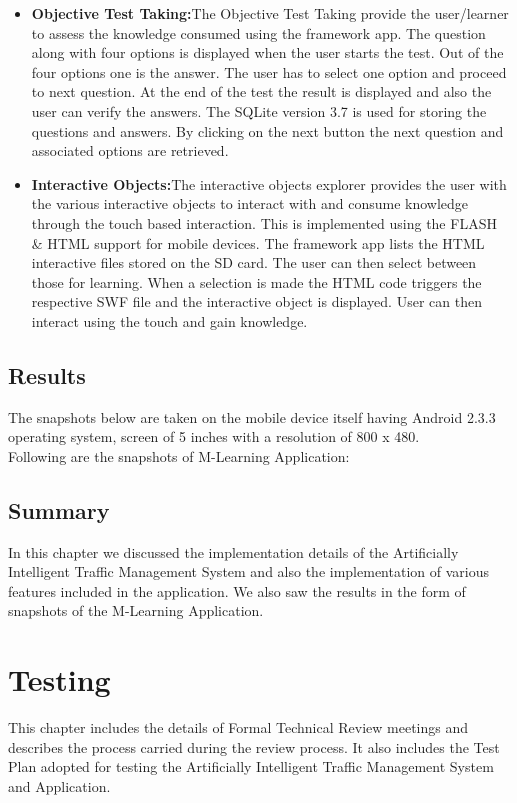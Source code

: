 \documentclass[openany,12pt]{report}
\begin{document}
\begin{itemize}
\item{\textbf{Objective Test Taking:}}The Objective Test Taking provide the user/learner to assess the knowledge consumed using the framework app. The question along with four options is displayed when the user starts the test. Out of the four options one is the answer. The user has to select one option and proceed to next question. At the end of the test the result is displayed and also the user can verify the answers. The SQLite version 3.7 is used for storing the questions and answers. By clicking on the next button the next question and associated options are retrieved.


\item{\textbf{Interactive Objects:}}The interactive objects explorer provides the user with the various interactive objects to interact with and consume knowledge through the touch based interaction. This is implemented using the FLASH \& HTML support for mobile devices. The framework app lists the HTML interactive files stored on the SD card. The user can then select between those for learning. When a selection is made the HTML code triggers the respective SWF file and the interactive object is displayed. User can then interact using the touch and gain knowledge.

\end{itemize}

\section{Results}
\hspace*{0.5in}The snapshots below are taken on the mobile device itself having Android 2.3.3 operating system, screen of 5 inches with a resolution of 800 x 480.\\
\hspace*{0.5in}Following are the snapshots of M-Learning Application:

\section{Summary}
\hspace*{0.5in}In this chapter we discussed the implementation details of the Artificially Intelligent Traffic Management System and also the implementation of various features included in the application. We also saw the results in the form of snapshots of the M-Learning Application.

\chapter{Testing}
\hspace*{0.5in}This chapter includes the details of Formal Technical Review meetings and describes the process carried during the review process. It also includes the Test Plan adopted for testing the Artificially Intelligent Traffic Management System and Application.
\end{document}
